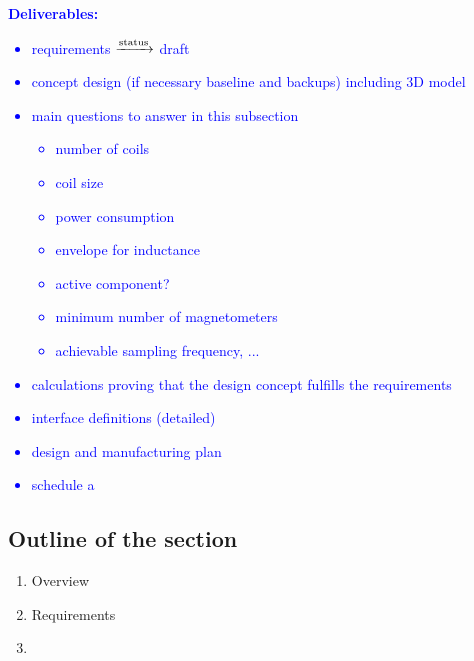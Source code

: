 \textcolor{blue}{
\textbf{Deliverables:}
\begin{itemize}
\item requirements $\xrightarrow{\rm status}$ draft
\item concept design (if necessary baseline and backups) including 3D model
\item main questions to answer in this subsection
    \begin{itemize}
    \item number of coils
    \item coil size
    \item power consumption
    \item envelope for inductance
    \item active component?
    \item minimum number of magnetometers
    \item achievable sampling frequency, ...
    \end{itemize}
\item calculations proving that the design concept fulfills the requirements 
\item interface definitions (detailed)
\item design and manufacturing plan
\item schedule
a\end{itemize}
}
\subsection*{Outline of the section}
 \begin{enumerate}
 \item Overview 
 \item Requirements 
 \item 
 
 \end{enumerate}
 
